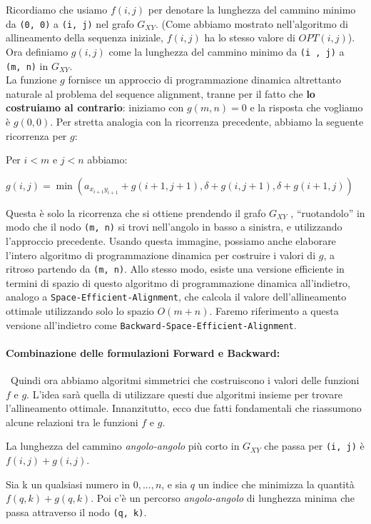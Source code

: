 Ricordiamo che
usiamo $f(i, j)$ per denotare la lunghezza del cammino minimo da
\texttt{(0,\ 0)} a \texttt{(i,\ j)} nel grafo $G_{XY}$. (Come abbiamo
mostrato nell'algoritmo di allineamento della sequenza iniziale,
$f(i, j)$ ha lo stesso valore di $OPT(i, j)$).\\ Ora definiamo
$g(i, j)$ come la lunghezza del cammino minimo da \texttt{(i\ ,\ j)} a
\texttt{(m,\ n)} in $G_{XY}$.\\ La funzione $g$ fornisce un approccio
di programmazione dinamica altrettanto naturale al problema del sequence
alignment, tranne per il fatto che \textbf{lo costruiamo al contrario}:
iniziamo con $g(m, n) = 0$ e la risposta che vogliamo è $g(0, 0)$.
Per stretta analogia con la ricorrenza precedente, abbiamo la seguente
ricorrenza per $g$:
\begin{myblockquote} Per $i < m$ e $j < n$ abbiamo:
  \begin{center}
    $g(i, j) = \min(a_{x_{i+1} y_{i+1}} + g(i + 1, j + 1), \delta + g(i, j + 1), \delta + g (i + 1, j))$
  \end{center}
\end{myblockquote}

Questa è solo la ricorrenza che si ottiene prendendo il grafo $G_{XY}$
, ``ruotandolo'' in modo che il nodo \texttt{(m,\ n)} si trovi
nell'angolo in basso a sinistra, e utilizzando l'approccio precedente.
Usando questa immagine, possiamo anche elaborare l'intero algoritmo di
programmazione dinamica per costruire i valori di $g$, a ritroso
partendo da \texttt{(m,\ n)}. Allo stesso modo, esiste una versione
efficiente in termini di spazio di questo algoritmo di programmazione
dinamica all'indietro, analogo a \texttt{Space-Efficient-Alignment}, che
calcola il valore dell'allineamento ottimale utilizzando solo lo spazio
$O(m+n)$. Faremo riferimento a questa versione all'indietro
come \texttt{Backward-Space-Efficient-Alignment}.\\

\paragraph*{Combinazione delle formulazioni Forward e Backward:}\
Quindi ora
abbiamo algoritmi simmetrici che costruiscono i valori delle funzioni
$f$ e $g$. L'idea sarà quella di utilizzare questi due algoritmi
insieme per trovare l'allineamento ottimale. Innanzitutto, ecco due
fatti fondamentali che riassumono alcune relazioni tra le funzioni $f$
e $g$.
\begin{myblockquote}
  La lunghezza del cammino \emph{angolo-angolo}
  più corto in $G_{XY}$ che passa per \texttt{(i, j)} è
  $f(i, j) + g(i, j)$.
\end{myblockquote}
\begin{myblockquote}
  Sia k un qualsiasi numero in ${0, . . . , n}$, e sia $q$ un indice
  che minimizza la quantità $f(q, k) + g(q, k)$. Poi c'è un percorso
  \emph{angolo-angolo} di lunghezza minima che passa attraverso il nodo \texttt{(q, k)}.
\end{myblockquote}

